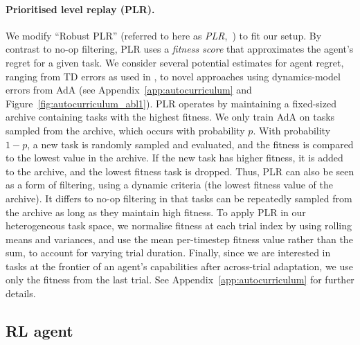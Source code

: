 \documentclass[11pt, a4paper, logo, copyright]{deepmind}
\begin{document}
\paragraph{Prioritised level replay (PLR).} We modify ``Robust PLR'' (referred to here as \emph{PLR},~\citet{jiang2021robustplr}) to fit our setup. By contrast to no-op filtering, PLR uses a \emph{fitness score} \citep{Schmidhuber1991surprise} that approximates the agent's regret for a given task. We consider several potential estimates for agent regret, ranging from TD errors as used in \citet{jiang2020prioritized}, to novel approaches using dynamics-model errors from AdA (see Appendix~\ref{app:autocurriculum} and Figure~\ref{fig:autocurriculum_abl1}).
PLR operates by maintaining a fixed-sized archive containing tasks with the highest fitness. We only train AdA on tasks sampled from the archive, which occurs with probability $p$. With probability $1-p$, a new task is randomly sampled and evaluated, and the fitness is compared to the lowest value in the archive. If the new task has higher fitness, it is added to the archive, and the lowest fitness task is dropped. Thus, PLR can also be seen as a form of filtering, using a dynamic criteria (the lowest fitness value of the archive). It differs to no-op filtering in that tasks can be repeatedly sampled from the archive as long as they maintain high fitness. To apply PLR in our heterogeneous task space, we normalise fitness at each trial index by using rolling means and variances, and use the mean per-timestep fitness value rather than the sum, to account for varying trial duration. Finally, since we are interested in tasks at the frontier of an agent's capabilities after across-trial adaptation, we use only the fitness from the last trial. See Appendix~\ref{app:autocurriculum} for further details.
\subsection{RL agent} \label{sec:methods_rl_agent}
\end{document}
